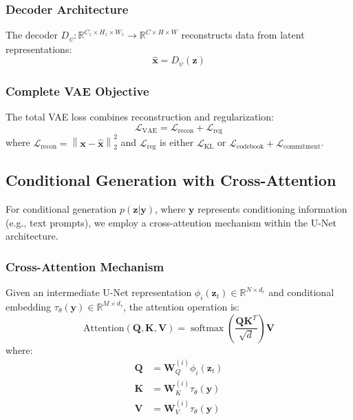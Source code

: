 \documentclass[12pt,twoside]{article}
\DeclareMathOperator{\softmax}{softmax}
\newcommand{\RR}{\mathbb{R}}
\newcommand{\KL}{\text{KL}}
\newcommand{\norm}[1]{\left\|#1\right\|}
\begin{document}
\subsubsection{Decoder Architecture}
\label{subsubsec:decoder_architecture}

The decoder $D_\psi: \RR^{C_z \times H_z \times W_z} \to \RR^{C \times H \times W}$ reconstructs data from latent representations:
\begin{equation}
\label{eq:decoder_mapping}
\hat{\mathbf{x}} = D_\psi(\mathbf{z})
\end{equation}

\subsubsection{Complete VAE Objective}
\label{subsubsec:complete_vae_objective}

The total VAE loss combines reconstruction and regularization:
\begin{equation}
\label{eq:total_vae_loss}
\mathcal{L}_{\text{VAE}} = \mathcal{L}_{\text{recon}} + \mathcal{L}_{\text{reg}}
\end{equation}
where $\mathcal{L}_{\text{recon}} = \norm{\mathbf{x} - \hat{\mathbf{x}}}_2^2$ and $\mathcal{L}_{\text{reg}}$ is either $\mathcal{L}_{\KL}$ or $\mathcal{L}_{\text{codebook}} + \mathcal{L}_{\text{commitment}}$.

\subsection{Conditional Generation with Cross-Attention}
\label{subsec:conditional_generation}

For conditional generation $p(\mathbf{z}|\mathbf{y})$, where $\mathbf{y}$ represents conditioning information (e.g., text prompts), we employ a cross-attention mechanism within the U-Net architecture.

\subsubsection{Cross-Attention Mechanism}
\label{subsubsec:cross_attention}

Given an intermediate U-Net representation $\phi_i(\mathbf{z}_t) \in \RR^{N \times d_\epsilon}$ and conditional embedding $\tau_\theta(\mathbf{y}) \in \RR^{M \times d_\tau}$, the attention operation is:
\begin{equation}
\label{eq:cross_attention}
\text{Attention}(\mathbf{Q}, \mathbf{K}, \mathbf{V}) = \softmax\left( \frac{\mathbf{Q}\mathbf{K}^T}{\sqrt{d}} \right) \mathbf{V}
\end{equation}
where:
\begin{align}
\label{eq:attention_projections}
\mathbf{Q} &= \mathbf{W}_Q^{(i)} \phi_i(\mathbf{z}_t) \nonumber \\
\mathbf{K} &= \mathbf{W}_K^{(i)} \tau_\theta(\mathbf{y}) \\
\mathbf{V} &= \mathbf{W}_V^{(i)} \tau_\theta(\mathbf{y}) \nonumber
\end{align}
\end{document}
